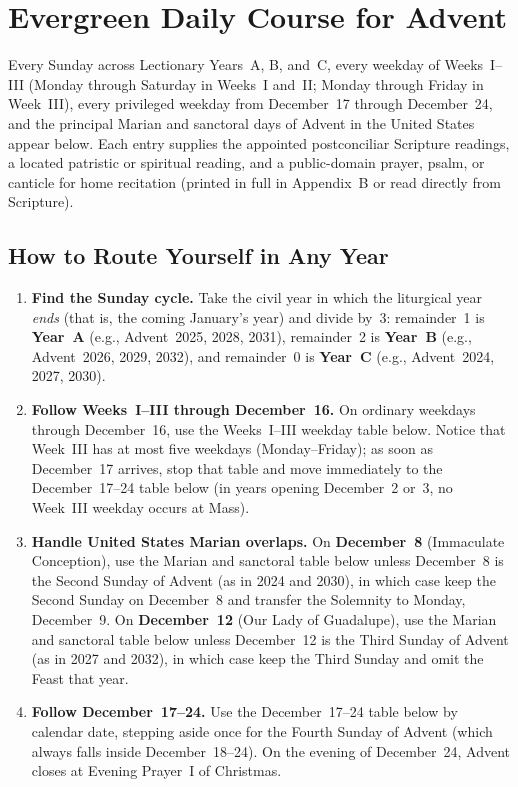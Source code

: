 \section{Evergreen Daily Course for Advent}\label{app:daily-course}

Every Sunday across Lectionary Years~A, B, and~C, every weekday of Weeks~I--III (Monday through Saturday in Weeks~I and~II; Monday through Friday in Week~III), every privileged weekday from December~17 through December~24, and the principal Marian and sanctoral days of Advent in the United States appear below. Each entry supplies the appointed postconciliar Scripture readings, a located patristic or spiritual reading, and a public-domain prayer, psalm, or canticle for home recitation (printed in full in Appendix~B or read directly from Scripture).

\subsection{How to Route Yourself in Any Year}

\begin{enumerate}
  \item \textbf{Find the Sunday cycle.} Take the civil year in which the liturgical year \textit{ends} (that is, the coming January's year) and divide by~3: remainder~1 is \textbf{Year~A} (e.g., Advent~2025, 2028, 2031), remainder~2 is \textbf{Year~B} (e.g., Advent~2026, 2029, 2032), and remainder~0 is \textbf{Year~C} (e.g., Advent~2024, 2027, 2030).
  \item \textbf{Follow Weeks~I--III through December~16.} On ordinary weekdays through December~16, use the Weeks~I--III weekday table below. Notice that Week~III has at most five weekdays (Monday--Friday); as soon as December~17 arrives, stop that table and move immediately to the December~17--24 table below (in years opening December~2 or~3, no Week~III weekday occurs at Mass).
  \item \textbf{Handle United States Marian overlaps.} On \textbf{December~8} (Immaculate Conception), use the Marian and sanctoral table below unless December~8 is the Second Sunday of Advent (as in 2024 and 2030), in which case keep the Second Sunday on December~8 and transfer the Solemnity to Monday, December~9. On \textbf{December~12} (Our Lady of Guadalupe), use the Marian and sanctoral table below unless December~12 is the Third Sunday of Advent (as in 2027 and 2032), in which case keep the Third Sunday and omit the Feast that year.
  \item \textbf{Follow December~17--24.} Use the December~17--24 table below by calendar date, stepping aside once for the Fourth Sunday of Advent (which always falls inside December~18--24). On the evening of December~24, Advent closes at Evening Prayer~I of Christmas.
\end{enumerate}

